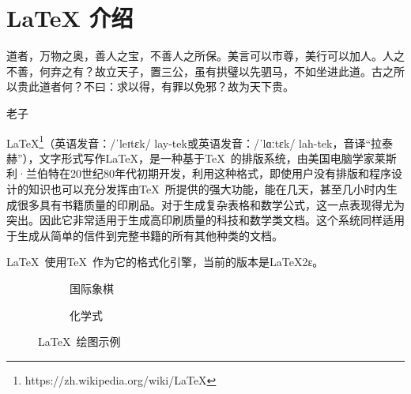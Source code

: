 \chapter{\LaTeX{} 介绍}
\epigraph{道者，万物之奥，善人之宝，不善人之所保。美言可以市尊，美行可以加人。人之不善，何弃之有？故立天子，置三公，虽有拱璧以先驷马，不如坐进此道。古之所以贵此道者何？不曰：求以得，有罪以免邪？故为天下贵。}{老子}

\LaTeX\footnote{https://zh.wikipedia.org/wiki/LaTeX}（英语发音：/ˈleɪtɛk/ lay-tek或英语发音：/ˈlɑːtɛk/ lah-tek，音译“拉泰赫”），文字形式写作\LaTeX ，是一种基于\TeX\ 的排版系统，由美国电脑学家莱斯利·兰伯特在20世纪80年代初期开发，利用这种格式，即使用户没有排版和程序设计的知识也可以充分发挥由\TeX\ 所提供的强大功能，能在几天，甚至几小时内生成很多具有书籍质量的印刷品。对于生成复杂表格和数学公式，这一点表现得尤为突出。因此它非常适用于生成高印刷质量的科技和数学类文档。这个系统同样适用于生成从简单的信件到完整书籍的所有其他种类的文档。

\LaTeX\ 使用\TeX\ 作为它的格式化引擎，当前的版本是\LaTeX 2ε。
\begin{figure}[htbp]
    \centering
    \begin{subfigure}[b]{0.45\textwidth}
        \centering
        \mbox{}\showboard
        \caption{国际象棋}
        \label{fig:mini:subfig:a} %
    \end{subfigure}
    \hfill
    \begin{subfigure}[b]{0.45\textwidth}
        \centering
        \caption{化学式}
        \label{fig:mini:subfig:b} %
    \end{subfigure}
\caption{\LaTeX\ 绘图示例}
    \label{fig:mini:subfig} %
\end{figure}

